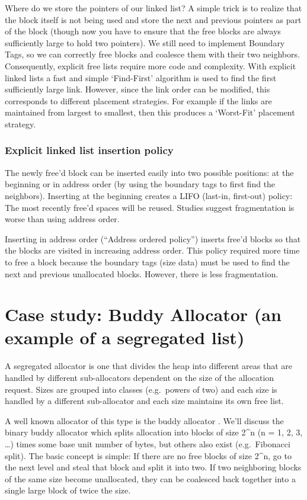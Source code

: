 Where do we store the pointers of our linked list?
A simple trick is to realize that the block itself is not being used and store the next and previous pointers as part of the block (though now you have to ensure that the free blocks are always sufficiently large to hold two pointers).
We still need to implement Boundary Tags, so we can correctly free blocks and coalesce them with their two neighbors.
Consequently, explicit free lists require more code and complexity.
With explicit linked lists a fast and simple `Find-First' algorithm is used to find the first sufficiently large link.
However, since the link order can be modified, this corresponds to different placement strategies.
For example if the links are maintained from largest to smallest, then this produces a `Worst-Fit' placement strategy.

\subsubsection{Explicit linked list insertion policy}

The newly free'd block can be inserted easily into two possible positions: at the beginning or in address order (by using the boundary tags to first find the neighbors).
Inserting at the beginning creates a LIFO (last-in, first-out) policy: The most recently free'd spaces will be reused. Studies suggest fragmentation is worse than using address order.

Inserting in address order (``Address ordered policy'') inserts free'd blocks so that the blocks are visited in increasing address order. This policy required more time to free a block because the boundary tags (size data) must be used to find the next and previous unallocated blocks. However, there is less fragmentation.

\section{Case study: Buddy Allocator (an example of a segregated list)}

A segregated allocator is one that divides the heap into different areas that are handled by different sub-allocators dependent on the size of the allocation request.
Sizes are grouped into classes (e.g.~powers of two) and each size is handled by a different sub-allocator and each size maintains its own free list.

A well known allocator of this type is the buddy allocator \cite[P. 85]{rangan1999foundations}.
We'll discuss the binary buddy allocator which splits allocation into blocks of size 2\^{}n (n = 1, 2, 3, \ldots{}) times some base unit number of bytes, but others also exist (e.g.~Fibonacci split).
The basic concept is simple: If there are no free blocks of size 2\^{}n, go to the next level and steal that block and split it into two.
If two neighboring blocks of the same size become unallocated, they can be coalesced back together into a single large block of twice the size.

